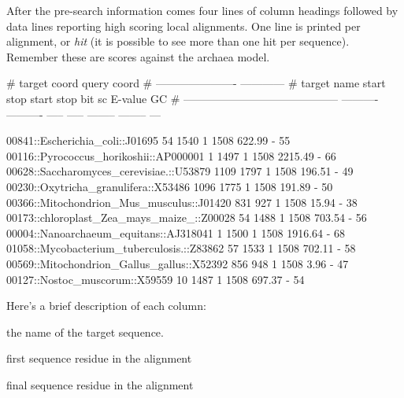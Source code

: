 After the pre-search information comes four lines of column headings
followed by data lines reporting high scoring local alignments. One
line is printed per alignment, or \emph{hit} (it is possible to see
more than one hit per sequence). Remember these are scores against the
archaea model.

\begin{sreoutputtiny}
#                                                       target coord   query coord                         
#                                             ----------------------  ------------                         
# target name                                      start        stop  start   stop    bit sc   E-value  GC%
# ------------------------------------------  ----------  ----------  -----  -----  --------  --------  ---

  00841::Escherichia_coli::J01695                     54        1540      1   1508    622.99         -   55
  00116::Pyrococcus_horikoshii::AP000001               1        1497      1   1508   2215.49         -   66
  00628::Saccharomyces_cerevisiae.::U53879          1109        1797      1   1508    196.51         -   49
  00230::Oxytricha_granulifera::X53486              1096        1775      1   1508    191.89         -   50
  00366::Mitochondrion_Mus_musculus::J01420          831         927      1   1508     15.94         -   38
  00173::chloroplast_Zea_mays_maize_::Z00028          54        1488      1   1508    703.54         -   56
  00004::Nanoarchaeum_equitans::AJ318041               1        1500      1   1508   1916.64         -   68
  01058::Mycobacterium_tuberculosis.::Z83862          57        1533      1   1508    702.11         -   58
  00569::Mitochondrion_Gallus_gallus::X52392         856         948      1   1508      3.96         -   47
  00127::Nostoc_muscorum::X59559                      10        1487      1   1508    697.37         -   54
\end{sreoutputtiny}

Here's a brief description of each column:

\begin{wideitem}
\item[\emprog{target name}] the name of the target sequence.

\item[\emprog{start (target coord)}] first sequence residue in the alignment

\item[\emprog{end (target coord)}] final sequence residue in the alignment
\end{wideitem}

